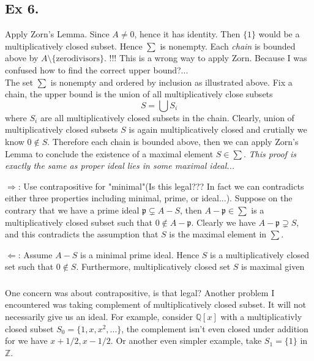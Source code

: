 \subsection{Ex 6.}\label{Atiyah Chap 3 Ex 6.}

Apply Zorn's Lemma. Since $A\neq 0$, hence it has identity. Then $\{1\}$ would be a multiplicatively closed subset. Hence $\sum$ is nonempty. Each \textit{chain} is bounded above by $A\setminus\{\text{zerodivisors}\}$. !!!
This is a wrong way to apply Zorn. Because I was confused how to find the correct upper bound?...\\

The set $\sum$ is nonempty and ordered by inclusion as illustrated above. Fix a chain, the upper bound is the union of all multiplicatively close subsets \[S=\bigcup S_i\] where $S_i$ are all multiplicatively closed subsets in the chain. Clearly, union of multiplicatively closed subsets $S$ is again multiplicatively closed and crutially we know $0\notin S$. Therefore each chain is bounded above, then we can apply Zorn's Lemma to conclude the existence of a maximal element $S\in \sum$. \textit{This proof is exactly the same as proper ideal lies in some maximal ideal...}

$\Rightarrow$: Use contrapositive for "minimal"(Is this legal??? In fact we can contradicts either three properties including minimal, prime, or ideal...). Suppose on the contrary that we have a prime ideal $\mathfrak p\subsetneq A-S$, then $A-\mathfrak p\in \sum$ is a multiplicatively closed subset such that $0\notin A-\mathfrak p$. Clearly we have $A-\mathfrak p\supsetneq S$, and this contradicts the assumption that $S$ is the maximal element in $\sum$.

$\Leftarrow$: Assume $A-S$ is a minimal prime ideal. Hence $S$ is a multiplicatively closed set such that $0\notin S$. Furthermore, multiplicatively closed set $S$ is maximal given

\subsubsection{}
One concern was about contrapositive, is that legal? Another problem I encountered was taking complement of multiplicatively closed subset. It will not necessarily give us an ideal. For example, consider $\mathbb Q[x]$ with a multiplicativly closed subset $S_0=\{1,x,x^2,...\}$, the complement isn't even closed under addition for we have $x+1/2,x-1/2$. Or another even simpler example, take $S_1=\{1\}$ in $\mathbb Z$.

